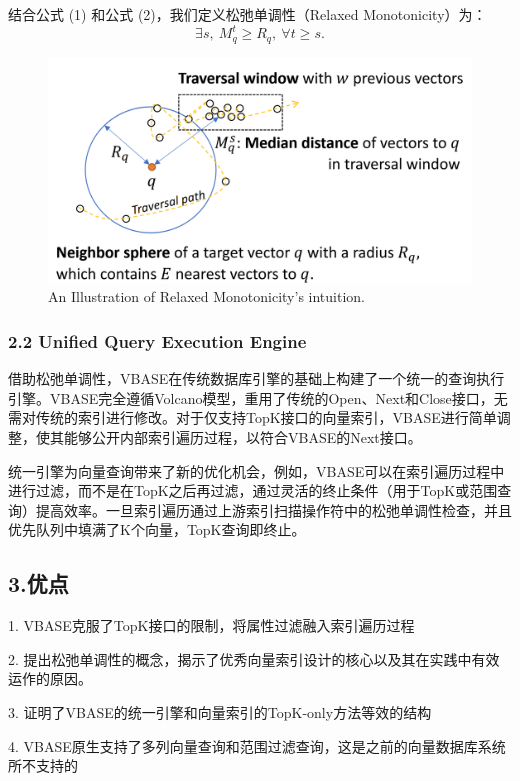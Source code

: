 \documentclass[12pt,UTF8,AutoFakeBold=2,a4paper]{ctexart} %
\begin{document}
结合公式 (1) 和公式 (2)，我们定义松弛单调性（Relaxed Monotonicity）为：
\begin{equation}
    \exists s, \ M_{q}^{t} \geq R_{q}, \ \forall t \geq s. \tag{3}
\end{equation}
\begin{figure}[!th]
\begin{center}
\includegraphics[width=5in]{Relaxed Monotonicity.png}
\caption{{ An Illustration of Relaxed Monotonicity’s intuition.}}
\label{fig:3}
\end{center}
\end{figure}
{\subsubsection{2.2 Unified Query Execution Engine}}
借助松弛单调性，VBASE在传统数据库引擎的基础上构建了一个统一的查询执行引擎。VBASE完全遵循Volcano模型，重用了传统的Open、Next和Close接口，无需对传统的索引进行修改。对于仅支持TopK接口的向量索引，VBASE进行简单调整，使其能够公开内部索引遍历过程，以符合VBASE的Next接口。

统一引擎为向量查询带来了新的优化机会，例如，VBASE可以在索引遍历过程中进行过滤，而不是在TopK之后再过滤，通过灵活的终止条件（用于TopK或范围查询）提高效率。一旦索引遍历通过上游索引扫描操作符中的松弛单调性检查，并且优先队列中填满了K个向量，TopK查询即终止。

{\subsection{3.优点}}
1. VBASE克服了TopK接口的限制，将属性过滤融入索引遍历过程

2. 提出松弛单调性的概念，揭示了优秀向量索引设计的核心以及其在实践中有效运作的原因。

3. 证明了VBASE的统一引擎和向量索引的TopK-only方法等效的结构

4. VBASE原生支持了多列向量查询和范围过滤查询，这是之前的向量数据库系统所不支持的
\end{document}
